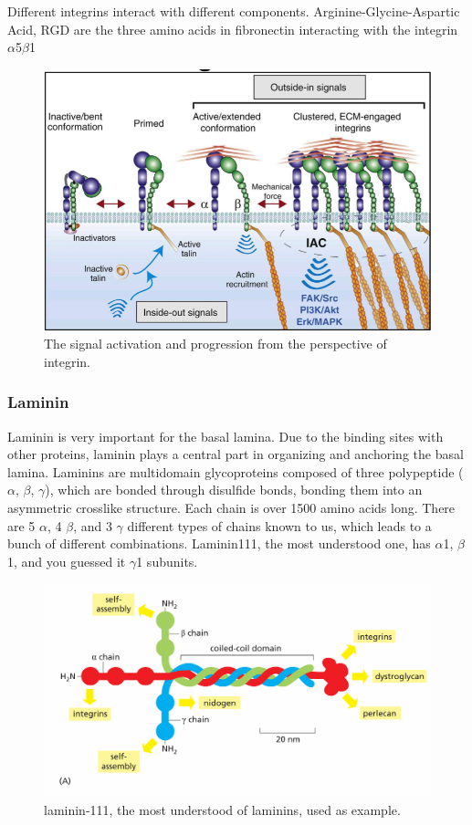 \documentclass[../main.tex]{subfiles}
\begin{document}
Different integrins interact with different components. Arginine-Glycine-Aspartic Acid, RGD are the three amino acids in fibronectin interacting with the integrin $\alpha$5$\beta$1

\begin{figure}[H]
	\centering
	\includegraphics[width=0.5\linewidth]{int_sign}
	\caption{The signal activation and progression from the perspective of integrin.}
	\label{fig:intsign}
\end{figure}


\subsubsection{Laminin}

\gls{Laminin} is very important for the basal lamina. Due to the binding sites with other proteins, laminin plays a central part in organizing and anchoring the basal lamina. Laminins are multidomain glycoproteins composed of three polypeptide ($\alpha$, $\beta$, $\gamma$), which are bonded through disulfide bonds, bonding them into an asymmetric crosslike structure. Each chain is over 1500 amino acids long. There are 5 $\alpha$, 4 $\beta$, and 3 $\gamma$ different types of chains known to us, which leads to a bunch of different combinations. \gls{Laminin111}, the most understood one, has $\alpha$1, $\beta$1, and you guessed it $\gamma$1 subunits. 

\begin{figure}[H]
	\centering
	\includegraphics[width=0.7\linewidth]{bl_111}
	\caption{laminin-111, the most understood of laminins, used as example.}
	\label{fig:bl111}
\end{figure}
\end{document}
